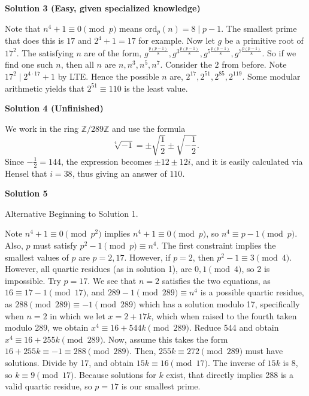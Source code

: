 \begin{enumerate}
 



\textbf{Solution 3 (Easy, given specialized knowledge)}

Note that $n^4 + 1 \equiv 0 \pmod{p}$ means $\text{ord}_{p}(n) = 8 \mid p-1.$ The smallest prime that does this is $17$ and $2^4 + 1 = 17$ for example. Now let $g$ be a primitive root of $17^2.$ The satisfying $n$ are of the form, $g^{\frac{p(p-1)}{8}}, g^{3\frac{p(p-1)}{8}}, g^{5\frac{p(p-1)}{8}}, g^{7\frac{p(p-1)}{8}}.$ So if we find one such $n$, then all $n$ are $n, n^3, n^5, n^7.$ Consider the $2$ from before. Note $17^2 \mid 2^{4 \cdot 17} + 1$ by LTE. Hence the possible $n$ are, $2^{17}, 2^{51}, 2^{85}, 2^{119}.$ Some modular arithmetic yields that $2^{51} \equiv \boxed{110}$ is the least value. 

 



\textbf{Solution 4 (Unfinished)}

We work in the ring \(\mathbb Z/289\mathbb Z\) and use the formula
 \[\sqrt[4]{-1}=\pm\sqrt{\frac12}\pm\sqrt{-\frac12}.\]Since \(-\frac12=144\), the expression becomes \(\pm12\pm12i\), and it is easily calculated via Hensel that \(i=38\), thus giving an answer of \(\boxed{110}\).

 



\textbf{Solution 5}

Alternative Beginning to Solution 1.

 Note $n^4 + 1 \equiv 0 \pmod{p^2}$ implies $n^4 + 1 \equiv 0 \pmod{p}$, so $n^4 \equiv p-1 \pmod{p}$. Also, $p$ must satisfy $p^2 - 1 \pmod{p} \equiv n^4$. The first constraint implies the smallest values of $p$ are $p = 2,17$. However, if $p = 2$, then $p^2 - 1 \equiv 3 \pmod{4}$. However, all quartic residues (as in solution 1), are $0, 1 \pmod{4}$, so 2 is impossible. Try $p = 17$. We see that $n = 2$ satisfies the two equations, as $16 \equiv 17-1 \pmod{17}$, and $289 - 1 \pmod{289} \equiv n^4$ is a possible quartic residue, as $288 \pmod{289} \equiv -1 \pmod{289}$ which has a solution modulo 17, specifically when $n = 2$ in which we let $x = 2+17k$, which when raised to the fourth taken modulo 289, we obtain $x^4 \equiv 16 + 544k \pmod{289}$. Reduce 544 and obtain $x^4 \equiv 16 + 255k \pmod{289}$. Now, assume this takes the form $16 + 255k \equiv -1 \equiv 288 \pmod{289}$. Then, $255k \equiv 272 \pmod{289}$ must have solutions. Divide by 17, and obtain $15k \equiv 16 \pmod{17}$. The inverse of $15k$ is 8, so $k \equiv 9 \pmod{17}$. Because solutions for $k$ exist, that directly implies 288 is a valid quartic residue, so $p = 17$ is our smallest prime.


\end{enumerate}
